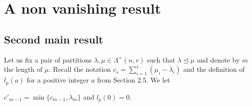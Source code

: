 \documentclass[ALCO,Unicode]{cedram}
\newcommand{\la}{\lambda}
\newcommand{\La}{\Lambda}
\numberwithin{equation}{section}
\begin{document}
\section{A non vanishing result}
 
\subsection{Second main result}\label{s5.1}Let us fix a pair of partitions $\la, \mu \in \La^{+}(n,r)$ such that $\lambda \unlhd \mu$ and denote by $m$ the length of $\mu$. Recall the notation $c_s=\sum_{i=1}^{s}(\mu_i - \lambda_i)$ and the definition of $l_p(a)$ for a positive integer $a$ from Section 2.5. We let \begin{center}
	$c'_{m-1}=\min\{c_{m-1}, \lambda_{m}\}$ and $l_p(0)=0$. 
\end{center}
\end{document}
